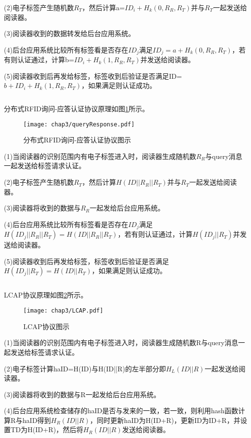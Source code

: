 (2)电子标签产生随机数$R_{T}$，然后计算a=$ID_{i}+H_{k}(0,R_{R},R_{T})$并与$R_{T}$一起发送给阅读器。

(3)阅读器收到的数据转发给后台应用系统。

(4)后台应用系统比较所有标签看是否存在$ID_{j}$满足$ID_{j}=a+H_{k}(0,R_{R},R_{T})$，若有则认证通过，计算b=$ID_{i}+H_{k}(1,R_{R},R_{T})$并发送给阅读器。

(5)阅读器收到后再发给标签，标签收到后验证是否满足ID=$b+ID_{i}+H_{k}(1,R_{R},R_{T})$，如果满足则认证成功。

\[\]

分布式RFID询问-应答认证协议原理如图\ref{fig:分布式RFID询问-应答认证协议图示}所示。

\begin{figure}[H]
	\centering
	\texttt{[image: chap3/queryResponse.pdf]}
	\caption{分布式RFID询问-应答认证协议图示}\label{fig:分布式RFID询问-应答认证协议图示}
\end{figure}

(1)当阅读器的识别范围内有电子标签进入时，阅读器生成随机数$R_{R}$与query消息一起发送给标签请求认证。

(2)电子标签产生随机数$R_{T}$，然后计算$H(ID||R_{R}||R_{T})$并与$R_{T}$一起发送给阅读器。

(3)阅读器将收到的数据与$R_{R}$一起发给后台应用系统。

(4)后台应用系统比较所有标签看是否存在$ID_{j}$满足$H(ID_{j}||R_{R}||R_{T})=H(ID||R_{R}||R_{T})$，若有则认证通过，计算$H(ID_{j}||R_{T})$并发送给阅读器。

(5)阅读器收到后再发给标签，标签收到后验证是否满足$H(ID_{j}||R_{T})=H(ID||R_{T})$，如果满足则认证成功。

\[\]

LCAP协议原理如图\ref{fig:LCAP协议图示}所示。

\begin{figure}[H]
	\centering
	\texttt{[image: chap3/LCAP.pdf]}
	\caption{LCAP协议图示}\label{fig:LCAP协议图示}
\end{figure}

(1)当阅读器的识别范围内有电子标签进入时，阅读器生成随机数R与query消息一起发送给标签请求认证。

(2)电子标签计算haID=H(ID)与H(ID||R)的左半部分即$H_{L}(ID||R)$一起发送给阅读器。

(3)阅读器将收到的数据与R一起发给后台应用系统。

(4)后台应用系统检查储存的haID是否与发来的一致，若一致，则利用hash函数计算R与haID得到$H_{R}(ID||R)$，同时更新haID为H(ID+R)，更新ID为ID+R，并设置TD为H(ID+R)，然后将$H_{R}(ID||R)$发送给阅读器。

